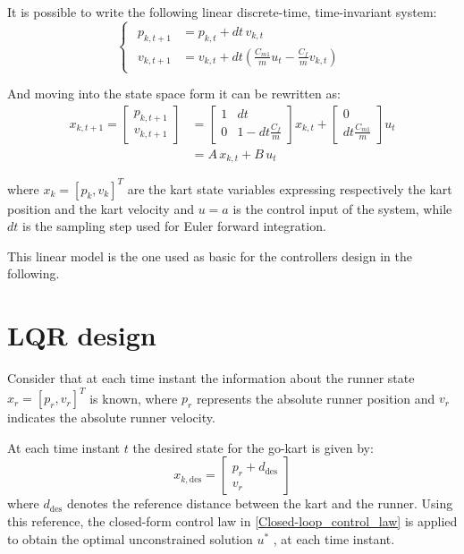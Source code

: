\documentclass[a4paper,12pt,oneside]{book}
\begin{document}
It is possible to write the following linear discrete-time, time-invariant system:
\begin{equation}
\begin{cases}
	\begin{aligned}
		p_{k,t+1} &= p_{k,t} + dt \, v_{k,t} \\
		v_{k,t+1} &= v_{k,t} + dt \left( \frac{C_{m1}}{m} u_t - \frac{C_f}{m} v_{k,t}  \right)
	\end{aligned}
\end{cases}
\end{equation}

And moving into the state space form it can be rewritten as:
\begin{equation}
    \begin{aligned}
    	x_{k,t+1} = 
    		\begin{bmatrix}
    			p_{k,t+1} \\
    			v_{k,t+1}
    		\end{bmatrix}
    		& =
    		\begin{bmatrix}
    			1 & dt \\
    			0 & 1-dt\frac{C_f}{m}
    		\end{bmatrix}
    		x_{k,t}
    		+
    		\begin{bmatrix}
    			0 \\
    			dt \frac{C_{m1}}{m}
    		\end{bmatrix}
    		u_t \\
    		& = A \, x_{k,t} + B \, u_t
    \end{aligned}
\label{Linear_system}
\end{equation}

where $x_k = [p_k , v_k] ^T$  are the kart state variables expressing respectively the kart position and the kart velocity and $u = a$ is the control input of the system, while $dt$ is the sampling step used for Euler forward integration.

This linear model is the one used as basic for the controllers design in the following.

\newpage
\section{LQR design}
Consider that at each time instant the information about the runner state $x_r =[p_r , v_r] ^T $ is known, where $p_r$ represents the absolute runner position and $v_r$ indicates the absolute runner velocity.

At each time instant $t$ the desired state for the go-kart is given by:
\begin{equation}
    x_{k,\text{des}} =
    \begin{bmatrix}
        p_r + d_{\text{des}} \\
        v_r
    \end{bmatrix}
\end{equation}
where $d_{\text{des}}$ denotes the reference distance between the kart and the runner.
Using this reference, the closed-form control law in \ref{Closed-loop_control_law} is applied to obtain the optimal unconstrained solution $u^*$ , at each time instant.
\end{document}
